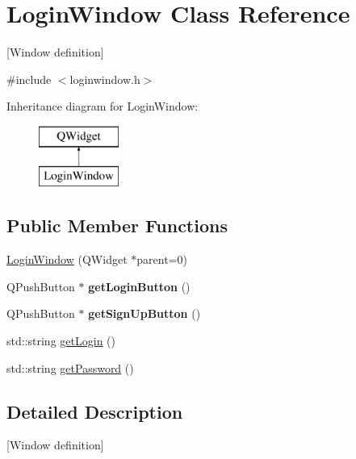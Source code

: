 \hypertarget{class_login_window}{}\section{Login\+Window Class Reference}
\label{class_login_window}


\mbox{[}Window definition\mbox{]}  




{\ttfamily \#include $<$loginwindow.\+h$>$}

Inheritance diagram for Login\+Window\+:\begin{figure}[H]
\begin{center}
\leavevmode
\includegraphics[height=2.000000cm]{class_login_window}
\end{center}
\end{figure}
\subsection*{Public Member Functions}
\begin{DoxyCompactItemize}
\item 
\mbox{\hyperlink{class_login_window_aacfb01de174b9eaf5a712bbfd4b6d9b5}{Login\+Window}} (Q\+Widget $\ast$parent=0)
\item 
\mbox{\label{class_login_window_aca8271de7c4e99516ee30940767847f6}} 
Q\+Push\+Button $\ast$ {\bfseries get\+Login\+Button} ()
\item 
\mbox{\label{class_login_window_a837947cbea225ff915780d79bd2797df}} 
Q\+Push\+Button $\ast$ {\bfseries get\+Sign\+Up\+Button} ()
\item 
std\+::string \mbox{\hyperlink{class_login_window_abb7c1af4eff6d4bcfcae122ee77089f1}{get\+Login}} ()
\item 
std\+::string \mbox{\hyperlink{class_login_window_a708710b83651cfa427d8f213b6a1890e}{get\+Password}} ()
\end{DoxyCompactItemize}


\subsection{Detailed Description}
\mbox{[}Window definition\mbox{]} 


